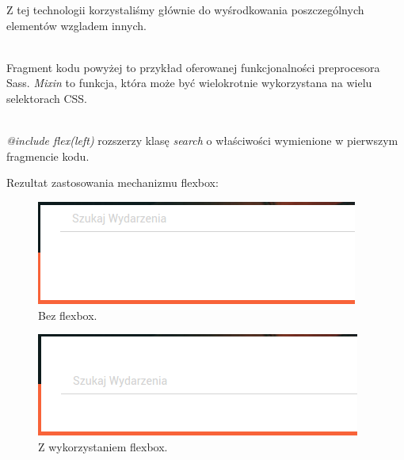 Z tej technologii korzystaliśmy głównie do wyśrodkowania poszczególnych elementów wzgladem innych.

\begin{code}
	
\end{code}\\

Fragment kodu powyżej to przykład oferowanej funkcjonalności preprocesora Sass. \emph{Mixin} to funkcja, która może być wielokrotnie wykorzystana na wielu selektorach CSS.

\begin{code}
	
\end{code}\\

\emph{@include flex(left)} rozszerzy klasę \emph{search} o właściwości wymienione w pierwszym fragmencie kodu.

Rezultat zastosowania mechanizmu flexbox:
\begin{figure}[h]
	\centering
  \includegraphics[scale=0.8]{images/flex_before.png}
  \caption{Bez flexbox.}
\end{figure}

\begin{figure}[h]
	\centering
  \includegraphics[scale=0.8]{images/flex_after.png}
  \caption{Z wykorzystaniem flexbox.}
\end{figure}

